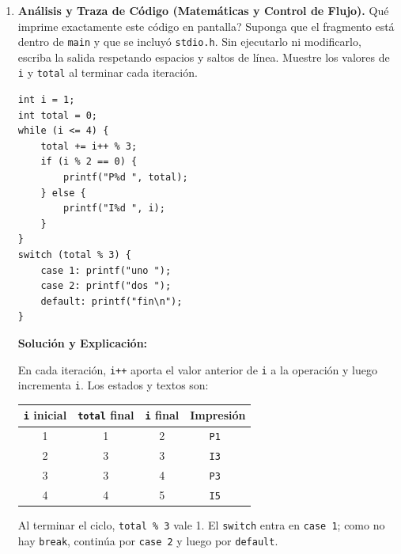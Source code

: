 \documentclass[11pt,letterpaper]{article}
\begin{document}
\begin{enumerate}[label=\textbf{\arabic*.}]
\begin{enumerate}[label=(\alph*)]
\begin{solucionbox}
        \end{solucionbox}
        \item Si \texttt{dato} es un \texttt{unsigned char} de 8 bits, \textquestiondown{}qué valor queda almacenado después de la asignación? Explique el resultado.
        \begin{lstlisting}[style=customc]
unsigned char dato = 255;
dato = dato + 1;
        \end{lstlisting}
        \begin{solucionbox}
        \textbf{Solución y Explicación:}\par
        El valor almacenado es \textbf{0}. Para la suma, \texttt{dato} se promueve a \texttt{int}, por lo que se calcula $255+1=256$. Al asignarlo a \texttt{unsigned char}, se reduce módulo $256$: el resto es 0. Esta conversión sin signo está definida; no ocurre desbordamiento de \texttt{int}.
        \end{solucionbox}
    \end{enumerate}

    \newpage
    \item \textbf{Análisis y Traza de Código (Matemáticas y Control de Flujo).}
    \textquestiondown{}Qué imprime exactamente este código en pantalla? Suponga que el fragmento está dentro de \texttt{main} y que se incluyó \texttt{stdio.h}. Sin ejecutarlo ni modificarlo, escriba la salida respetando espacios y saltos de línea. Muestre los valores de \texttt{i} y \texttt{total} al terminar cada iteración.
    \begin{lstlisting}[style=customc]
int i = 1;
int total = 0;
while (i <= 4) {
    total += i++ % 3;
    if (i % 2 == 0) {
        printf("P%d ", total);
    } else {
        printf("I%d ", i);
    }
}
switch (total % 3) {
    case 1: printf("uno ");
    case 2: printf("dos ");
    default: printf("fin\n");
}
    \end{lstlisting}
    \begin{solucionbox}
    \textbf{Solución y Explicación:}\par
    En cada iteración, \texttt{i++} aporta el valor anterior de \texttt{i} a la operación y luego incrementa \texttt{i}. Los estados y textos son:
    \begin{center}
    \begin{tabular}{cccc}
    \toprule
    \texttt{i} inicial & \texttt{total} final & \texttt{i} final & Impresión \\
    \midrule
    1 & 1 & 2 & \texttt{P1 } \\
    2 & 3 & 3 & \texttt{I3 } \\
    3 & 3 & 4 & \texttt{P3 } \\
    4 & 4 & 5 & \texttt{I5 } \\
    \bottomrule
    \end{tabular}
    \end{center}
    Al terminar el ciclo, \texttt{total \% 3} vale 1. El \texttt{switch} entra en \texttt{case 1}; como no hay \texttt{break}, continúa por \texttt{case 2} y luego por \texttt{default}.


\end{solucionbox}
\end{enumerate}
\end{document}

